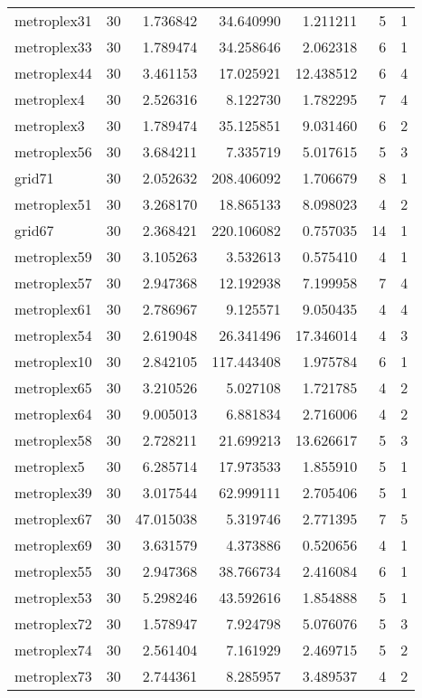 \documentclass[../../../thesis.tex]{subfiles}
\begin{document}
\begin{longtable}{|l|r|r|r|r|r|r|}
metroplex31 & 30 & 1.736842 & 34.640990 & 1.211211 & 5 & 1 \\
metroplex33 & 30 & 1.789474 & 34.258646 & 2.062318 & 6 & 1 \\
metroplex44 & 30 & 3.461153 & 17.025921 & 12.438512 & 6 & 4 \\
metroplex4 & 30 & 2.526316 & 8.122730 & 1.782295 & 7 & 4 \\
metroplex3 & 30 & 1.789474 & 35.125851 & 9.031460 & 6 & 2 \\
metroplex56 & 30 & 3.684211 & 7.335719 & 5.017615 & 5 & 3 \\
grid71 & 30 & 2.052632 & 208.406092 & 1.706679 & 8 & 1 \\
metroplex51 & 30 & 3.268170 & 18.865133 & 8.098023 & 4 & 2 \\
grid67 & 30 & 2.368421 & 220.106082 & 0.757035 & 14 & 1 \\
metroplex59 & 30 & 3.105263 & 3.532613 & 0.575410 & 4 & 1 \\
metroplex57 & 30 & 2.947368 & 12.192938 & 7.199958 & 7 & 4 \\
metroplex61 & 30 & 2.786967 & 9.125571 & 9.050435 & 4 & 4 \\
metroplex54 & 30 & 2.619048 & 26.341496 & 17.346014 & 4 & 3 \\
metroplex10 & 30 & 2.842105 & 117.443408 & 1.975784 & 6 & 1 \\
metroplex65 & 30 & 3.210526 & 5.027108 & 1.721785 & 4 & 2 \\
metroplex64 & 30 & 9.005013 & 6.881834 & 2.716006 & 4 & 2 \\
metroplex58 & 30 & 2.728211 & 21.699213 & 13.626617 & 5 & 3 \\
metroplex5 & 30 & 6.285714 & 17.973533 & 1.855910 & 5 & 1 \\
metroplex39 & 30 & 3.017544 & 62.999111 & 2.705406 & 5 & 1 \\
metroplex67 & 30 & 47.015038 & 5.319746 & 2.771395 & 7 & 5 \\
metroplex69 & 30 & 3.631579 & 4.373886 & 0.520656 & 4 & 1 \\
metroplex55 & 30 & 2.947368 & 38.766734 & 2.416084 & 6 & 1 \\
metroplex53 & 30 & 5.298246 & 43.592616 & 1.854888 & 5 & 1 \\
metroplex72 & 30 & 1.578947 & 7.924798 & 5.076076 & 5 & 3 \\
metroplex74 & 30 & 2.561404 & 7.161929 & 2.469715 & 5 & 2 \\
metroplex73 & 30 & 2.744361 & 8.285957 & 3.489537 & 4 & 2 \\

\end{longtable}
\end{document}
